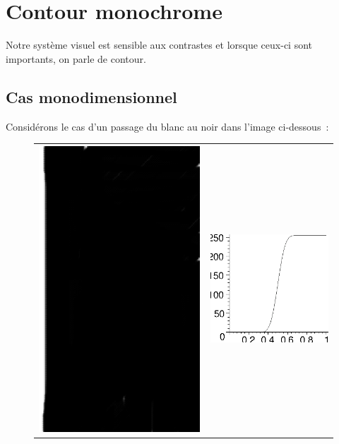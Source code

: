 \documentclass[a4paper]{article}
\begin{document}
\section{Contour monochrome}
\label{sec:contour}
Notre syst\`eme visuel est sensible aux contrastes et lorsque ceux-ci
sont importants, on parle de contour.
\subsection{Cas monodimensionnel}
Consid\'erons le cas d'un passage du blanc au noir dans l'image
ci-dessous~:
\begin{figure}[htbp]
  \begin{center}
\begin{tabular}{cc}
  \includegraphics[scale=0.4]{NoirBlanc}   &
  \includegraphics{fct}  \\

\end{tabular}
\end{center}
\end{figure}
\end{document}
